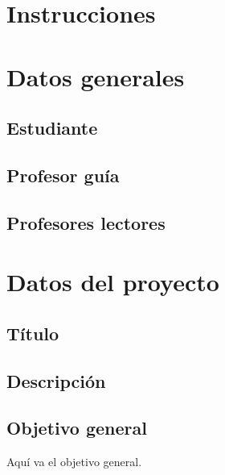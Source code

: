 \documentclass{avance-preliminar}
\begin{document}

\encabezado

\section*{Instrucciones}

\instrucciones

\section*{Datos generales}

\subsection*{Estudiante}
\estudiante

\subsection*{Profesor guía}
\profesorguia

\subsection*{Profesores lectores}
\profesoreslectores

\section*{Datos del proyecto}

\subsection*{Título}
\eltitulo

\newpage

\subsection*{Descripción}

\ifvacio
	\vspace{4cm}
\else
\lipsum[1]
\fi

\subsection*{Objetivo general}
\ifvacio
	\vspace{4cm}
\else
Aquí va el objetivo general.
\fi
\end{document}
